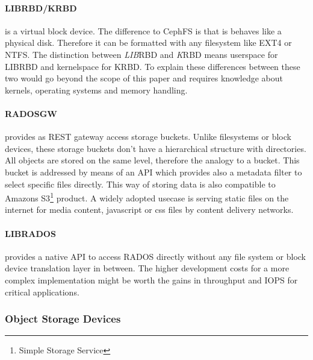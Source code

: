 \documentclass[titlepage, a4paper, 11pt]{scrartcl}
\begin{document}
                \paragraph{LIBRBD/KRBD} is a virtual block device. The difference to CephFS is that is behaves like a physical disk.
                Therefore it can be formatted with any filesystem like EXT4 or NTFS. The distinction between \textit{LIB}RBD and \textit{K}RBD
                means userspace for LIBRBD and kernelspace for KRBD. To explain these differences between these two would go beyond the 
                scope of this paper and requires knowledge about kernels, operating systems and memory handling. 

                \paragraph{RADOSGW} provides as REST gateway access storage buckets. Unlike filesystems or block devices, these storage
                buckets don't have a hierarchical structure with directories. All objects are stored on the same level, therefore the 
                analogy to a bucket. This bucket is addressed by means of an API which provides also a metadata filter to select
                specific files directly. This way of storing data is also compatible to Amazons S3\footnote{Simple Storage Service} product.
                A widely adopted usecase is serving static files on the internet for media content, javascript or css files by content delivery networks.

                \paragraph{LIBRADOS} provides a native API to access RADOS directly without any file system or block device translation layer in
                between. The higher development costs for a more complex implementation might be worth the gains in throughput and IOPS
                for critical applications.

            
            \subsubsection{Object Storage Devices}
\end{document}
